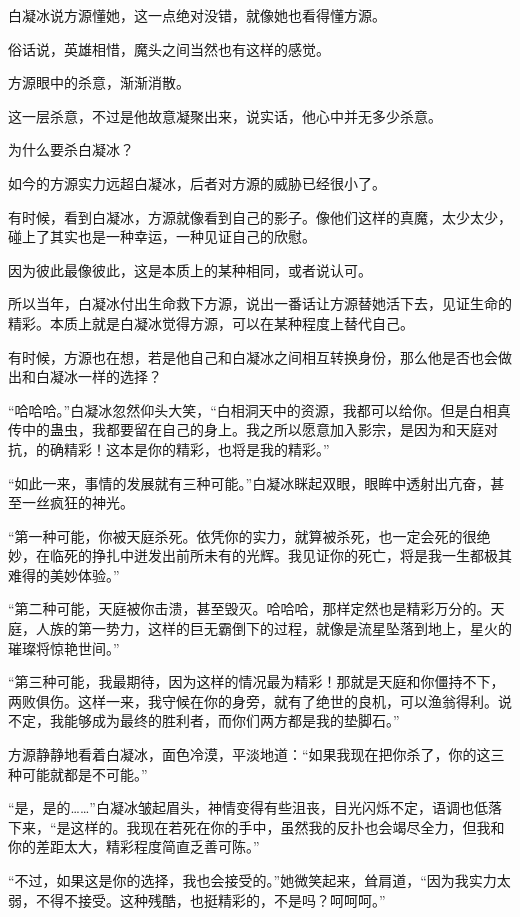 \begin{this_body}
白凝冰说方源懂她，这一点绝对没错，就像她也看得懂方源。

俗话说，英雄相惜，魔头之间当然也有这样的感觉。

方源眼中的杀意，渐渐消散。

这一层杀意，不过是他故意凝聚出来，说实话，他心中并无多少杀意。

为什么要杀白凝冰？

如今的方源实力远超白凝冰，后者对方源的威胁已经很小了。

有时候，看到白凝冰，方源就像看到自己的影子。像他们这样的真魔，太少太少，碰上了其实也是一种幸运，一种见证自己的欣慰。

因为彼此最像彼此，这是本质上的某种相同，或者说认可。

所以当年，白凝冰付出生命救下方源，说出一番话让方源替她活下去，见证生命的精彩。本质上就是白凝冰觉得方源，可以在某种程度上替代自己。

有时候，方源也在想，若是他自己和白凝冰之间相互转换身份，那么他是否也会做出和白凝冰一样的选择？

“哈哈哈。”白凝冰忽然仰头大笑，“白相洞天中的资源，我都可以给你。但是白相真传中的蛊虫，我都要留在自己的身上。我之所以愿意加入影宗，是因为和天庭对抗，的确精彩！这本是你的精彩，也将是我的精彩。”

“如此一来，事情的发展就有三种可能。”白凝冰眯起双眼，眼眸中透射出亢奋，甚至一丝疯狂的神光。

“第一种可能，你被天庭杀死。依凭你的实力，就算被杀死，也一定会死的很绝妙，在临死的挣扎中迸发出前所未有的光辉。我见证你的死亡，将是我一生都极其难得的美妙体验。”

“第二种可能，天庭被你击溃，甚至毁灭。哈哈哈，那样定然也是精彩万分的。天庭，人族的第一势力，这样的巨无霸倒下的过程，就像是流星坠落到地上，星火的璀璨将惊艳世间。”

“第三种可能，我最期待，因为这样的情况最为精彩！那就是天庭和你僵持不下，两败俱伤。这样一来，我守候在你的身旁，就有了绝世的良机，可以渔翁得利。说不定，我能够成为最终的胜利者，而你们两方都是我的垫脚石。”

方源静静地看着白凝冰，面色冷漠，平淡地道：“如果我现在把你杀了，你的这三种可能就都是不可能。”

“是，是的……”白凝冰皱起眉头，神情变得有些沮丧，目光闪烁不定，语调也低落下来，“是这样的。我现在若死在你的手中，虽然我的反扑也会竭尽全力，但我和你的差距太大，精彩程度简直乏善可陈。”

“不过，如果这是你的选择，我也会接受的。”她微笑起来，耸肩道，“因为我实力太弱，不得不接受。这种残酷，也挺精彩的，不是吗？呵呵呵。”


\end{this_body}
